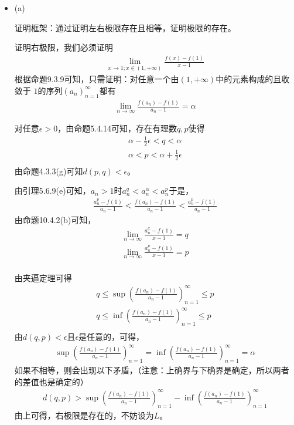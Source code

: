 \documentclass{article}
\begin{document}
\begin{itemize}
  \item (a)

        证明框架：通过证明左右极限存在且相等，证明极限的存在。

        证明右极限，我们必须证明
        \begin{align*}
          \lim\limits_{x \to 1; x \in (1, +\infty) } \frac{f(x) - f(1)}{x - 1}
        \end{align*}
        根据命题9.3.9可知，只需证明：对任意一个由$(1, +\infty)$中的元素构成的且收敛于
        $1$的序列$(a_n)_{n=1}^\infty$都有
        \begin{align*}
          \lim\limits_{n \to \infty} \frac{f(a_n) - f(1)}{a_n - 1} = \alpha
        \end{align*}

        对任意$\epsilon > 0$，由命题5.4.14可知，存在有理数$q, p$使得
        \begin{align*}
          \alpha - \frac{1}{2}\epsilon < q < \alpha \\
          \alpha < p < \alpha + \frac{1}{2}\epsilon \\
        \end{align*}
        由命题4.3.3(g)可知$d(p, q) < \epsilon$。

        由引理5.6.9(e)可知，$a_n > 1$时$a_n^{q} < a_n^\alpha < a_n^{p}$于是，
        \begin{align*}
          \frac{a_n^{p} - f(1)}{a_n - 1} < \frac{f(a_n) - f(1)}{a_n - 1} < \frac{a_n^{p} - f(1)}{a_n - 1}
        \end{align*}
        由命题10.4.2(b)可知，
        \begin{align*}
          \lim\limits_{n \to \infty} \frac{a_n^{q} - f(1)}{x - 1} = q \\
          \lim\limits_{n \to \infty} \frac{a_n^{p} - f(1)}{x - 1} = p \\
        \end{align*}

        由夹逼定理可得
        \begin{align*}
          q \leq \sup(\frac{f(a_n) - f(1)}{a_n - 1})_{n=1}^\infty  \leq p \\
          q \leq \inf(\frac{f(a_n) - f(1)}{a_n - 1})_{n=1}^\infty  \leq p \\
        \end{align*}
        由$d(q, p) < \epsilon$且$\epsilon$是任意的，可得，
        \begin{align*}
          \sup(\frac{f(a_n) - f(1)}{a_n - 1})_{n=1}^\infty = \inf(\frac{f(a_n) - f(1)}{a_n - 1})_{n=1}^\infty = \alpha
        \end{align*}
        如果不相等，则会出现以下矛盾，（注意：上确界与下确界是确定，所以两者的差值也是确定的）
        \begin{align*}
          d(q, p) > \sup(\frac{f(a_n) - f(1)}{a_n - 1})_{n=1}^\infty - \inf(\frac{f(a_n) - f(1)}{a_n - 1})_{n=1}^\infty
        \end{align*}
        由上可得，右极限是存在的，不妨设为$L$。


\end{itemize}
\end{document}
